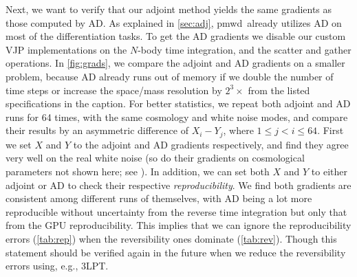 \documentclass[modern, dvipsnames]{aastex631}
\newcommand{\pmwd}{{\usefont{T1}{nova}{m}{sl}pmwd}}
\begin{document}
Next, we want to verify that our adjoint method yields the same
gradients as those computed by AD.
As explained in \autoref{sec:adj}, \pmwd\ already utilizes AD on most of
the differentiation tasks.
To get the AD gradients we disable our custom VJP implementations on the
$N$-body time integration, and the scatter and gather operations.
In \autoref{fig:grads}, we compare the adjoint and AD gradients on a
smaller problem, because AD already runs out of memory if we double the
number of time steps or increase the space/mass resolution by
$2^3\times$ from the listed specifications in the caption.
For better statistics, we repeat both adjoint and AD runs for 64 times,
with the same cosmology and white noise modes, and compare their results
by an asymmetric difference of $X_i - Y_j$, where $1 \leq j < i \leq
64$.
First we set $X$ and $Y$ to the adjoint and AD gradients respectively,
and find they agree very well on the real white noise (so do their
gradients on cosmological parameters not shown here; see
\href{https://github.com/eelregit/pmwd/tree/master/docs/papers/adjoint/grads.txt}{\faFile}).
In addition, we can set both $X$ and $Y$ to either adjoint or AD to
check their respective \emph{reproducibility}.
We find both gradients are consistent among different runs of
themselves, with AD being a lot more reproducible without uncertainty
from the reverse time integration but only that from the GPU
reproducibility.
This implies that we can ignore the reproducibility errors
(\autoref{tab:rep}) when the reversibility ones dominate
(\autoref{tab:rev}).
Though this statement should be verified again in the future when we
reduce the reversibility errors using, e.g., 3LPT.
\end{document}
